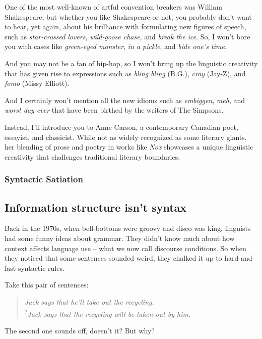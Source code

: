 One of the most well-known of artful convention breakers was William Shakespeare, but whether you like Shakespeare or not, you probably don't want to hear, yet again, about his brilliance with formulating new figures of speech, such as \textit{star-crossed lovers}, \textit{wild-goose chase}, and \textit{break the ice}. So, I won't bore you with cases like \textit{green-eyed monster}, \textit{in a pickle}, and \textit{bide one's time}.

And you may not be a fan of hip-hop, so I won't bring up the linguistic creativity that has given rise to expressions such as \textit{bling bling} (B.G.), \textit{cray} (Jay-Z), and \textit{fomo} (Missy Elliott).

And I certainly won't mention all the new idioms such as \textit{embiggen}, \textit{meh}, and \textit{worst day ever} that have been birthed by the writers of The Simpsons.

Instead, I'll introduce you to Anne Carson, a contemporary Canadian poet, essayist, and classicist. While not as widely recognized as some literary giants, her blending of prose and poetry in works like \textit{Nox} showcases a unique linguistic creativity that challenges traditional literary boundaries.

\subsubsection{Syntactic Satiation}


\subsection{Information structure isn't syntax}

Back in the 1970s, when bell-bottoms were groovy and disco was king, linguists had some funny ideas about grammar. They didn't know much about how context affects language use -- what we now call discourse conditions. So when they noticed that some sentences sounded weird, they chalked it up to hard-and-fast syntactic rules.

Take this pair of sentences:

\begin{quote}
\textit{Jack says that he'll take out the recycling.}\\
\textsuperscript{?}\textit{Jack says that the recycling will be taken out by him.}
\end{quote}

The second one sounds off, doesn't it? But why? 

